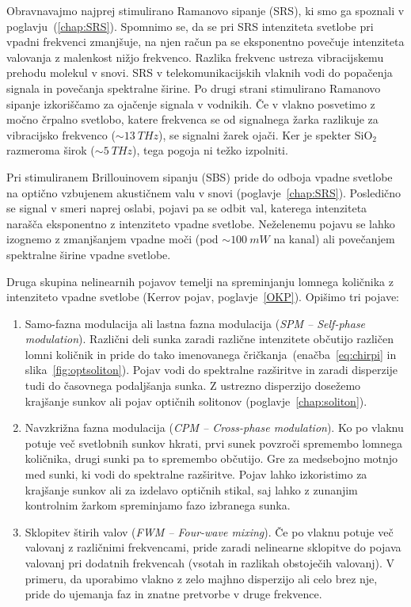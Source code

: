 Obravnavajmo najprej stimulirano Ramanovo sipanje 
(SRS), ki smo
ga spoznali v poglavju~(\ref{chap:SRS}). Spomnimo se, da se pri SRS intenziteta
svetlobe pri vpadni frekvenci zmanjšuje, na njen račun pa se eksponentno povečuje 
intenziteta valovanja z malenkost nižjo frekvenco. Razlika frekvenc ustreza
vibracijskemu prehodu molekul v snovi. SRS v telekomunikacijskih vlaknih 
vodi do popačenja signala
in povečanja spektralne širine. Po drugi strani stimulirano Ramanovo sipanje 
izkoriščamo za ojačenje signala v vodnikih. Če v vlakno posvetimo z močno črpalno
svetlobo, katere frekvenca se od signalnega žarka razlikuje za vibracijsko frekvenco
($\sim 13~\si{THz}$), se signalni žarek ojači. Ker je spekter SiO$_2$ razmeroma 
širok ($\sim 5~\si{THz}$), tega pogoja ni težko izpolniti. 

Pri stimuliranem Brillouinovem sipanju (SBS) pride
 do odboja vpadne svetlobe na 
optično vzbujenem akustičnem valu v snovi (poglavje~\ref{chap:SRS}). Posledično
se signal v smeri naprej oslabi, pojavi pa se odbit val, katerega intenziteta
narašča eksponentno z intenziteto vpadne svetlobe. 
Neželenemu pojavu se lahko izognemo z zmanjšanjem vpadne
moči (pod $\sim 100~\si{mW}$ na kanal) 
ali povečanjem spektralne širine vpadne svetlobe.

Druga skupina nelinearnih pojavov temelji na spreminjanju 
lomnega količnika z intenziteto vpadne svetlobe (Kerrov pojav, poglavje~\ref{OKP}).
Opišimo tri pojave:
\begin{enumerate}
\item 
Samo-fazna modulacija ali lastna fazna modulacija ({\it SPM -- Self-phase modulation}). Različni deli
sunka zaradi različne intenzitete občutijo različen lomni količnik in pride
do tako imenovanega čričkanja~(enačba~\ref{eq:chirpi} 
in slika~\ref{fig:optsoliton}). 
Pojav vodi do spektralne razširitve in zaradi
disperzije tudi do časovnega podaljšanja sunka. Z ustrezno disperzijo dosežemo 
krajšanje sunkov ali pojav optičnih solitonov (poglavje~\ref{chap:soliton}).

\item
Navzkrižna fazna modulacija ({\it CPM -- Cross-phase modulation}). Ko po vlaknu
potuje več svetlobnih sunkov hkrati, prvi sunek povzroči spremembo lomnega količnika, 
drugi sunki pa to spremembo občutijo. Gre za medsebojno motnjo med sunki, ki 
vodi do spektralne razširitve. Pojav lahko izkoristimo za krajšanje sunkov ali
za izdelavo optičnih stikal, 
saj lahko z zunanjim kontrolnim žarkom spreminjamo fazo izbranega sunka. 

\item
Sklopitev štirih valov ({\it FWM -- Four-wave mixing}). Če po vlaknu potuje več
valovanj z različnimi frekvencami, 
pride zaradi nelinearne sklopitve do pojava
valovanj pri dodatnih frekvencah (vsotah in razlikah obstoječih valovanj). V primeru, 
da uporabimo vlakno z zelo majhno disperzijo ali celo brez nje, pride do ujemanja
faz in znatne pretvorbe v druge frekvence.  
\end{enumerate}
